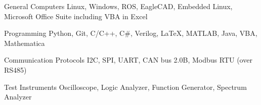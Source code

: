 

\begin{cvskills}

  \cvskill
    {General Computers} %
    {Linux, Windows, ROS, EagleCAD, Embedded Linux, Microsoft Office Suite including VBA in Excel} %

  \cvskill
    {Programming} %
    {Python, Git, C/C++, C\#, Verilog, LaTeX, MATLAB, Java, VBA, Mathematica} %

  \cvskill
    {Communication Protocols} %
    {I2C, SPI, UART, CAN bus 2.0B, Modbus RTU (over RS485)} %

  \cvskill
    {Test Instruments} %
    {Oscilloscope, Logic Analyzer, Function Generator, Spectrum Analyzer} %

\end{cvskills}
